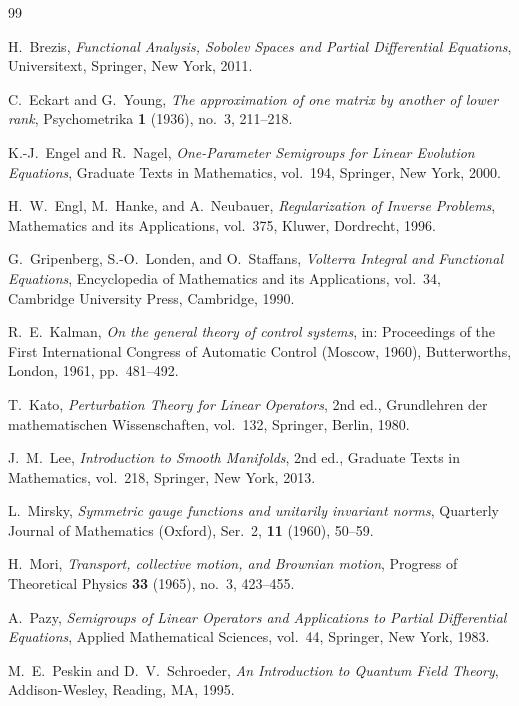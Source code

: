 \documentclass[11pt,reqno]{amsart}
\numberwithin{equation}{section}
\theoremstyle{plain}
\theoremstyle{definition}
\theoremstyle{remark}
\begin{document}
\begin{thebibliography}{99}

H.~Brezis,
\emph{Functional Analysis, Sobolev Spaces and Partial Differential Equations},
Universitext, Springer, New York, 2011.

C.~Eckart and G.~Young,
\emph{The approximation of one matrix by another of lower rank},
Psychometrika \textbf{1} (1936), no.~3, 211--218.

K.-J.~Engel and R.~Nagel,
\emph{One-Parameter Semigroups for Linear Evolution Equations},
Graduate Texts in Mathematics, vol.~194, Springer, New York, 2000.

H.~W.~Engl, M.~Hanke, and A.~Neubauer,
\emph{Regularization of Inverse Problems},
Mathematics and its Applications, vol.~375, Kluwer, Dordrecht, 1996.

G.~Gripenberg, S.-O.~Londen, and O.~Staffans,
\emph{Volterra Integral and Functional Equations},
Encyclopedia of Mathematics and its Applications, vol.~34,
Cambridge University Press, Cambridge, 1990.

R.~E.~Kalman,
\emph{On the general theory of control systems},
in: Proceedings of the First International Congress of Automatic Control (Moscow, 1960),
Butterworths, London, 1961, pp.~481--492.

T.~Kato,
\emph{Perturbation Theory for Linear Operators},
2nd ed., Grundlehren der mathematischen Wissenschaften, vol.~132, Springer, Berlin, 1980.

J.~M.~Lee,
\emph{Introduction to Smooth Manifolds},
2nd ed., Graduate Texts in Mathematics, vol.~218, Springer, New York, 2013.

L.~Mirsky,
\emph{Symmetric gauge functions and unitarily invariant norms},
Quarterly Journal of Mathematics (Oxford), Ser.~2, \textbf{11} (1960), 50--59.

H.~Mori,
\emph{Transport, collective motion, and Brownian motion},
Progress of Theoretical Physics \textbf{33} (1965), no.~3, 423--455.

A.~Pazy,
\emph{Semigroups of Linear Operators and Applications to Partial Differential Equations},
Applied Mathematical Sciences, vol.~44, Springer, New York, 1983.

M.~E.~Peskin and D.~V.~Schroeder,
\emph{An Introduction to Quantum Field Theory},
Addison-Wesley, Reading, MA, 1995.


\end{thebibliography}
\end{document}
